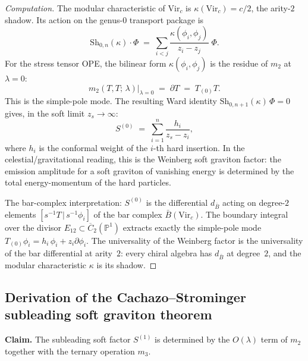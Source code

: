 \documentclass[11pt]{article}
\begin{document}
\begin{proof}[Computation]
The modular characteristic of $\mathrm{Vir}_c$ is
$\kappa(\mathrm{Vir}_c) = c/2$, the arity-$2$ shadow.
Its action on the genus-$0$ transport package is
\[
\mathrm{Sh}_{0,n}(\kappa) \cdot \Phi
\;=\;
\sum_{i < j}
\frac{\kappa(\phi_i, \phi_j)}{z_i - z_j}\;\Phi.
\]
For the stress tensor OPE, the bilinear form
$\kappa(\phi_i, \phi_j)$ is the residue of $m_2$ at
$\lambda = 0$:
\[
m_2(T, T;\, \lambda)\big|_{\lambda = 0}
\;=\; \partial T
\;=\; T_{(0)}T.
\]
This is the simple-pole mode.  The resulting Ward identity
$\mathrm{Sh}_{0,n+1}(\kappa)\,\Phi = 0$ gives, in the soft
limit $z_s \to \infty$:
\begin{equation}\label{eq:weinberg-from-m2}
\boxed{
S^{(0)}
\;=\;
\sum_{i=1}^{n}
\frac{h_i}{z_s - z_i},}
\end{equation}
where $h_i$ is the conformal weight of the $i$-th hard insertion.
In the celestial/gravitational reading, this is the Weinberg soft graviton factor: the emission amplitude for a soft graviton of vanishing energy is determined by the total energy-momentum of the hard particles.

The bar-complex interpretation: $S^{(0)}$ is the differential $d_{\bar{B}}$ acting on degree-$2$ elements $[s^{-1}T \,|\, s^{-1}\phi_i]$ of the bar complex $\bar{B}(\mathrm{Vir}_c)$.  The boundary integral over the divisor $E_{12} \subset \overline{C}_2(\mathbb{P}^1)$ extracts exactly the simple-pole mode $T_{(0)}\phi_i = h_i\,\phi_i + z_i\partial\phi_i$.  The universality of the Weinberg factor is the universality of the bar differential at arity~$2$: every chiral algebra has $d_{\bar{B}}$ at degree~$2$, and the modular characteristic $\kappa$ is its shadow.
\end{proof}

\subsection{Derivation of the Cachazo--Strominger subleading soft graviton theorem}

\noindent\textbf{Claim.} The subleading soft factor $S^{(1)}$ is determined by the $O(\lambda)$ term of $m_2$ together with the ternary operation $m_3$.
\end{document}
